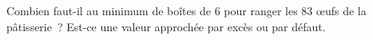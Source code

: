 %
%
Combien faut-il au minimum de boîtes de $6$ pour ranger les $83$ {\oe}ufs de la pâtisserie~? Est-ce une valeur approchée par excès ou par défaut.
